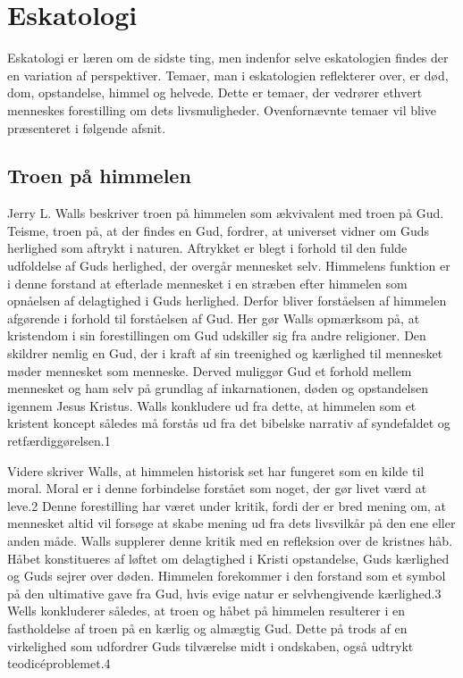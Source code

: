 \chapter{Eskatologi}
\label{chp:esk}
Eskatologi er læren om de sidste ting, men indenfor selve eskatologien findes der en variation af perspektiver. Temaer, man i eskatologien reflekterer over, er død, dom, opstandelse, himmel og helvede. Dette er temaer, der vedrører ethvert menneskes forestilling om dets livsmuligheder. Ovenfornævnte temaer vil blive præsenteret i følgende afsnit.

\section{Troen på himmelen}
Jerry L. Walls beskriver troen på himmelen som ækvivalent med troen på Gud. Teisme, troen på, at der findes en Gud, fordrer, at universet vidner om Guds herlighed som aftrykt i naturen. Aftrykket er blegt i forhold til den fulde udfoldelse af Guds herlighed, der overgår mennesket selv. Himmelens funktion er i denne forstand at efterlade mennesket i en stræben efter himmelen som opnåelsen af delagtighed i Guds herlighed. Derfor bliver forståelsen af himmelen afgørende i forhold til forståelsen af Gud. Her gør Walls opmærksom på, at kristendom i sin forestillingen om Gud udskiller sig fra andre religioner. Den skildrer nemlig en Gud, der i kraft af sin treenighed og kærlighed til mennesket møder mennesket som menneske. Derved muliggør Gud et forhold mellem mennesket og ham selv på grundlag af inkarnationen, døden og opstandelsen igennem Jesus Kristus. Walls konkludere ud fra dette, at himmelen som et kristent koncept således må forstås ud fra det bibelske narrativ af syndefaldet og retfærdiggørelsen.1 

Videre skriver Walls, at himmelen historisk set har fungeret som en kilde til moral. Moral er i denne forbindelse forstået som noget, der gør livet værd at leve.2 Denne forestilling har været under kritik, fordi der er bred mening om, at mennesket altid vil forsøge at skabe mening ud fra dets livsvilkår på den ene eller anden måde. Walls supplerer denne kritik med en refleksion over de kristnes håb. Håbet konstitueres af løftet om delagtighed i Kristi opstandelse, Guds kærlighed og Guds sejrer over døden. Himmelen forekommer i den forstand som et symbol på den ultimative gave fra Gud, hvis evige natur er selvhengivende kærlighed.3 Wells konkluderer således, at troen og håbet på himmelen resulterer i en fastholdelse af troen på en kærlig og almægtig Gud. Dette på trods af en virkelighed som udfordrer Guds tilværelse midt i ondskaben, også udtrykt teodicéproblemet.4

